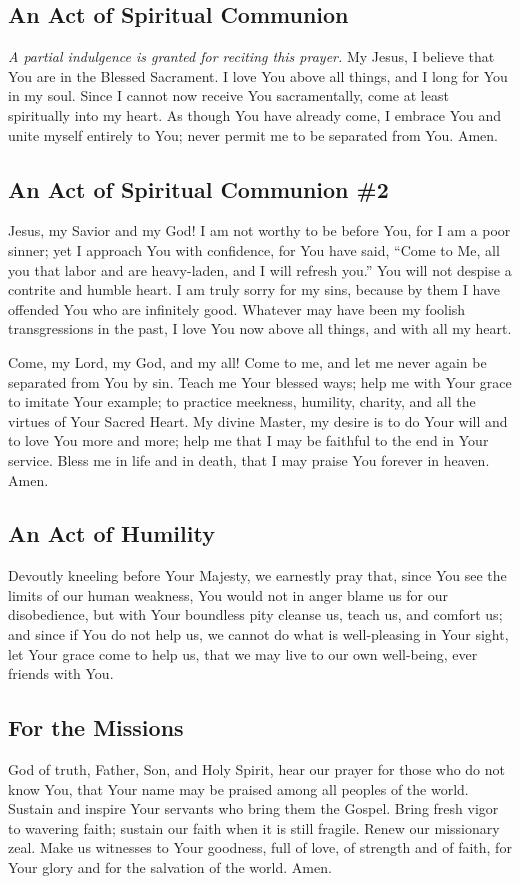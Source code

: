 \documentclass[12pt]{article}
\newcommand{\prayertitle}[1]{\subsection{#1}}
\newcommand{\indulgencedprayertitle}[1]{\prayertitle{#1 \protect\kreuz}}
\newcommand{\note}[1]{{\small{\textsl{#1}}}\newline}
\begin{document}
\indulgencedprayertitle{An Act of Spiritual Communion}
\note{A partial indulgence is granted for reciting this prayer.}
My Jesus, I believe that You are in the Blessed Sacrament.
I love You above all things, and I long for You in my soul.
Since I cannot now receive You sacramentally, come at least spiritually into my heart.
As though You have already come, I embrace You and unite myself entirely to You;
never permit me to be separated from You.
Amen.

\prayertitle{An Act of Spiritual Communion \#2}
Jesus, my Savior and my God!
I am not worthy to be before You, for I am a poor sinner;
yet I approach You with confidence, for You have said, ``Come to Me, all you that labor and are heavy-laden, and I will refresh you.''
You will not despise a contrite and humble heart.
I am truly sorry for my sins, because by them I have offended You who are infinitely good.
Whatever may have been my foolish transgressions in the past, I love You now above all things, and with all my heart.

Come, my Lord, my God, and my all!
Come to me, and let me never again be separated from You by sin.
Teach me Your blessed ways;
help me with Your grace to imitate Your example;
to practice meekness, humility, charity, and all the virtues of Your Sacred Heart.
My divine Master, my desire is to do Your will and to love You more and more;
help me that I may be faithful to the end in Your service.
Bless me in life and in death, that I may praise You forever in heaven.
Amen.

\prayertitle{An Act of Humility}
Devoutly kneeling before Your Majesty,
we earnestly pray that, since You see the limits of our human weakness, You would not in anger blame us for our disobedience, but with Your boundless pity cleanse us, teach us, and comfort us;
and since if You do not help us, we cannot do what is well-pleasing in Your sight, let Your grace come to help us, that we may live to our own well-being, ever friends with You.

\prayertitle{For the Missions}
God of truth, Father, Son, and Holy Spirit, hear our prayer for those who do not know You, that Your name may be praised among all peoples of the world.
Sustain and inspire Your servants who bring them the Gospel.
Bring fresh vigor to wavering faith; sustain our faith when it is still fragile.
Renew our missionary zeal.
Make us witnesses to Your goodness, full of love, of strength and of faith, for Your glory and for the salvation of the world.
Amen.
\end{document}
